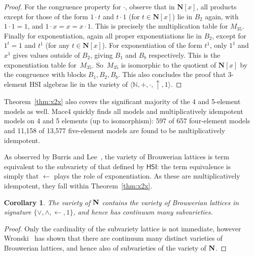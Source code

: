 \documentclass[eqnor,reqno]{amsart}
\theoremstyle{plain}
\newtheorem{cor}[thm]{Corollary}
\theoremstyle{definition}
\newcommand{\HSI}{\textsf{HSI}}
\begin{document}
\begin{proof}
For the congruence property for $\cdot$, observe that in $\mathbf{N}[x]$, all products except for those of the form $1\cdot t$ and $t\cdot 1$ (for $t\in \mathbf{N}[x]$) lie in $B_2$ again, with $1\cdot 1=1$, and $1\cdot x=x=x\cdot 1$.  
This is precisely the multiplication table for $M_{35}$.  
Finally for exponentiation, again all proper exponentiations lie in $B_2$, except for $1^t=1$ and $t^1$ (for any $t\in \mathbf{N}[x]$).  
For exponentiation of the form $t^1$,  only $1^1$ and $x^1$ gives values outside of $B_2$, giving $B_1$ and $B_b$ respectively.  
This is the exponentiation table for~$M_{35}$.  
So~$M_{35}$ is isomorphic to the quotient of  $\mathbf{N}[x]$ by the congruence with blocks $B_1,B_2,B_b$.
This also concludes the proof that $3$-element HSI algebras lie in the variety of $\langle\mathbb{N},+,\cdot,\uparrow,1\rangle$.
\end{proof}

Theorem~\ref{thm:x2x} also covers the significant majority of the 4 and 5-element models as well.  Mace4 quickly finds all models and multiplicatively idempotent models on 4 and 5 elements (up to isomorphism): 597 of 657 four-element models and 11,158 of 13,577 five-element models are found to be multiplicatively idempotent.

As observed by Burris and Lee~\cite[Proposition~5.3]{burlee92}, the variety of Brouwerian lattices is term equivalent to the subvariety of that defined by $\HSI$: the term equivalence is simply that $\leftarrow$ plays the role of exponentiation.  As these are multiplicatively idempotent, they fall within Theorem~\ref{thm:x2x}. 
\begin{cor}\label{cor:Brouwerian}
The variety of ${\bf N}$ contains the variety of Brouwerian lattices in signature $\{\vee,\wedge,\leftarrow,1\}$, and hence has continuum many subvarieties.
\end{cor}
\begin{proof}
Only the cardinality of the subvariety lattice is not immediate, however Wronski~\cite{wro} has shown that there are continuum many distinct varieties of Brouwerian lattices, and hence also of subvarieties of the variety of ${\bf N}$.
\end{proof}
\end{document}
